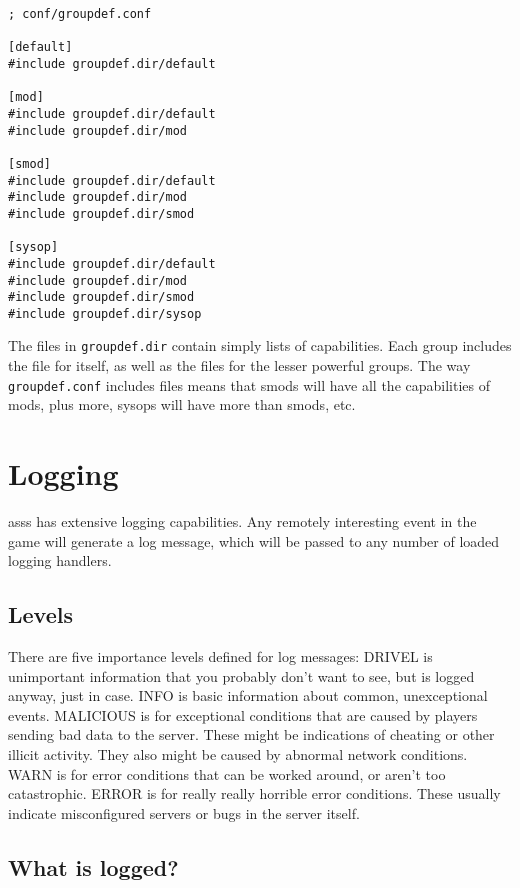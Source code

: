 \documentclass{article}
\newcommand{\asss}{asss}
\begin{document}
\begin{verbatim}
; conf/groupdef.conf

[default]
#include groupdef.dir/default

[mod]
#include groupdef.dir/default
#include groupdef.dir/mod

[smod]
#include groupdef.dir/default
#include groupdef.dir/mod
#include groupdef.dir/smod

[sysop]
#include groupdef.dir/default
#include groupdef.dir/mod
#include groupdef.dir/smod
#include groupdef.dir/sysop
\end{verbatim}

The files in \verb/groupdef.dir/ contain simply lists of capabilities.
Each group includes the file for itself, as well as the files for the
lesser powerful groups. The way \verb/groupdef.conf/ includes files
means that smods will have all the capabilities of mods, plus more,
sysops will have more than smods, etc.


\section{Logging}

\asss{} has extensive logging capabilities. Any remotely interesting
event in the game will generate a log message, which will be passed to
any number of loaded logging handlers.

\subsection{Levels}

There are five importance levels defined for log messages: DRIVEL is
unimportant information that you probably don't want to see, but is
logged anyway, just in case. INFO is basic information about common,
unexceptional events. MALICIOUS is for exceptional conditions that are
caused by players sending bad data to the server. These might be
indications of cheating or other illicit activity. They also might be
caused by abnormal network conditions. WARN is for error conditions that
can be worked around, or aren't too catastrophic. ERROR is for really
really horrible error conditions. These usually indicate misconfigured
servers or bugs in the server itself.

\subsection{What is logged?}
\end{document}
